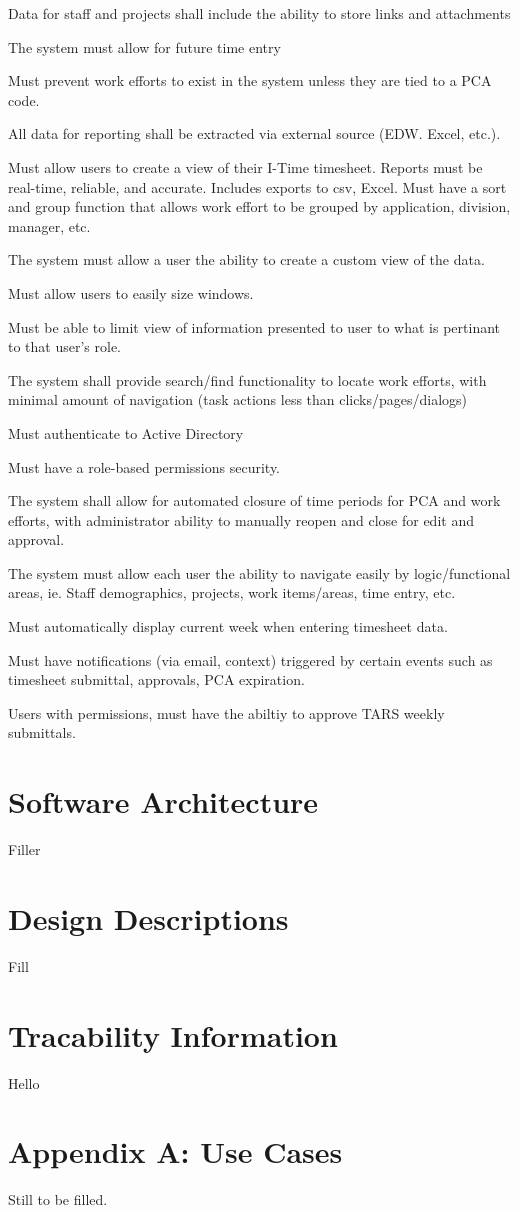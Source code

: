 \documentclass[letterpaper]{article}
\begin{document}
Data for staff and projects shall include the ability to store links and attachments

The system must allow for future time entry

Must prevent work efforts to exist in the system unless they are tied to a PCA code.

All data for reporting shall be extracted via external source (EDW. Excel, etc.).

Must allow users to create a view of their I-Time timesheet. 
Reports must be real-time, reliable, and accurate. Includes exports to csv, Excel. 
Must have a sort and group function that allows work effort to be grouped by application, division, manager, etc.

The system must allow a user the ability to create a custom view of the data.

Must allow users to easily size windows.

Must be able to limit view of information presented to user to what is pertinant to that user's role.

The system shall provide search/find functionality to locate work efforts, with minimal amount of navigation (task actions less than clicks/pages/dialogs)

Must authenticate to Active Directory

Must have a role-based permissions security.

The system shall allow for automated closure of time periods for PCA and work efforts, with administrator ability to manually reopen and close for edit and approval.

The system must allow each user the ability to navigate easily by logic/functional areas, ie. Staff demographics, projects, work items/areas, time entry, etc.

Must automatically display current week when entering timesheet data.

Must have notifications (via email, context) triggered by certain events such as timesheet submittal, approvals, PCA expiration. 

Users with permissions, must have the abiltiy to approve TARS weekly submittals.

\section{Software Architecture} 
Filler
\section{Design Descriptions}
Fill
\section{Tracability Information}
Hello
\section{Appendix A: Use Cases} 
Still to be filled.
\end{document}
